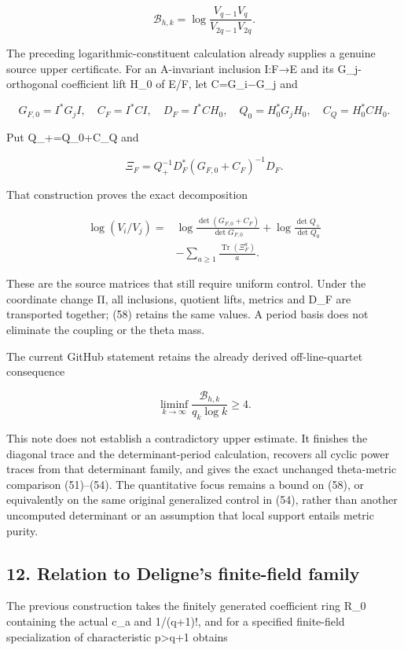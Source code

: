 \[
\mathcal B_{h,k}
 =\log\frac{V_{q-1}V_q}{V_{2q-1}V_{2q}}.
\tag{55}
\]

The preceding logarithmic-constituent calculation already supplies a genuine source upper certificate. For an A-invariant inclusion I:F→E and its G\_j-orthogonal coefficient lift H\_0 of E/F, let C=G\_i−G\_j and

\[
G_{F,0}=I^*G_jI,\quad C_F=I^*CI,\quad
D_F=I^*CH_0,\quad Q_0=H_0^*G_jH_0,\quad C_Q=H_0^*CH_0.
\tag{56}
\]

Put Q\_+=Q\_0+C\_Q and

\[
\Xi_F=Q_+^{-1}D_F^*(G_{F,0}+C_F)^{-1}D_F.
\tag{57}
\]

That construction proves the exact decomposition

\[
\begin{aligned}
\log(V_i/V_j)
={}&\log\frac{\det(G_{F,0}+C_F)}{\det G_{F,0}}
 +\log\frac{\det Q_+}{\det Q_0}\\
&-\sum_{a\ge1}\frac{\operatorname{Tr}(\Xi_F^a)}a.
\end{aligned}
\tag{58}
\]

These are the source matrices that still require uniform control. Under the coordinate change Π, all inclusions, quotient lifts, metrics and D\_F are transported together; (58) retains the same values. A period basis does not eliminate the coupling or the theta mass.

The current GitHub statement retains the already derived off-line-quartet consequence

\[
\liminf_{k\to\infty}\frac{\mathcal B_{h,k}}{q_k\log k}\ge4.
\tag{59}
\]

This note does not establish a contradictory upper estimate. It finishes the diagonal trace and the determinant-period calculation, recovers all cyclic power traces from that determinant family, and gives the exact unchanged theta-metric comparison (51)--(54). The quantitative focus remains a bound on (58), or equivalently on the same original generalized control in (54), rather than another uncomputed determinant or an assumption that local support entails metric purity.

\subsection{12. Relation to Deligne's finite-field family}\label{endpoint-sga_trace_period--relation-to-delignes-finite-field-family}

The previous construction takes the finitely generated coefficient ring R\_0 containing the actual c\_a and 1/(q+1)!, and for a specified finite-field specialization of characteristic p\textgreater q+1 obtains

